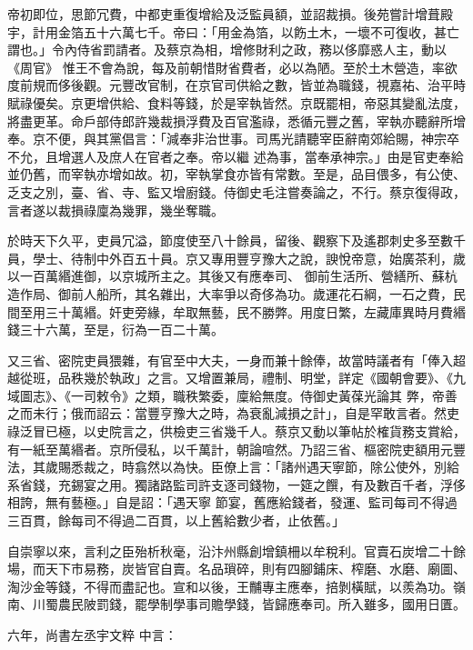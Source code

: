 \begin{pinyinscope}
 帝初即位，思節冗費，中都吏重復增給及泛監員額，並詔裁損。後苑嘗計增葺殿宇，計用金箔五十六萬七千。帝曰：「用金為箔，以飭土木，一壞不可復收，甚亡謂也。」令內侍省罰請者。及蔡京為相，增修財利之政，務以侈靡惑人主，動以《周官》
 惟王不會為說，每及前朝惜財省費者，必以為陋。至於土木營造，率欲度前規而侈後觀。元豐改官制，在京官司供給之數，皆並為職錢，視嘉祐、治平時賦祿優矣。京更增供給、食料等錢，於是宰執皆然。京既罷相，帝惡其變亂法度，將盡更革。命戶部侍郎許幾裁損浮費及百官濫祿，悉循元豐之舊，宰執亦聽辭所增奉。京不便，與其黨倡言：「減奉非治世事。司馬光請聽宰臣辭南郊給賜，神宗卒不允，且增選人及庶人在官者之奉。帝以繼
 述為事，當奉承神宗。」由是官吏奉給並仍舊，而宰執亦增如故。初，宰執掌食亦皆有常數。至是，品目偎多，有公使、乏支之別，臺、省、寺、監又增廚錢。侍御史毛注嘗奏論之，不行。蔡京復得政，言者遂以裁損祿廩為幾罪，幾坐奪職。



 於時天下久平，吏員冗溢，節度使至八十餘員，留後、觀察下及遙郡刺史多至數千員，學士、待制中外百五十員。京又專用豐亨豫大之說，諛悅帝意，始廣茶利，歲以一百萬緡進御，以京城所主之。其後又有應奉司、
 御前生活所、營繕所、蘇杭造作局、御前人船所，其名雜出，大率爭以奇侈為功。歲運花石綱，一石之費，民間至用三十萬緡。奸吏旁緣，牟取無藝，民不勝弊。用度日繁，左藏庫異時月費緡錢三十六萬，至是，衍為一百二十萬。



 又三省、密院吏員猥雜，有官至中大夫，一身而兼十餘俸，故當時議者有「俸入超越從班，品秩幾於執政」之言。又增置兼局，禮制、明堂，詳定《國朝會要》、《九域圖志》、《一司敕令》之類，職秩繁委，廩給無度。侍御史黃葆光論其
 弊，帝善之而未行；俄而詔云：當豐亨豫大之時，為衰亂減損之計」，自是罕敢言者。然吏祿泛冒已極，以史院言之，供檢吏三省幾千人。蔡京又動以筆帖於榷貨務支賞給，有一紙至萬緡者。京所侵私，以千萬計，朝論喧然。乃詔三省、樞密院吏額用元豐法，其歲賜悉裁之，時翕然以為快。臣僚上言：「諸州遇天寧節，除公使外，別給系省錢，充錫宴之用。獨諸路監司許支逐司錢物，一筵之饌，有及數百千者，浮侈相誇，無有藝極。」自是詔：「遇天寧
 節宴，舊應給錢者，發運、監司每司不得過三百貫，餘每司不得過二百貫，以上舊給數少者，止依舊。」



 自崇寧以來，言利之臣殆析秋毫，沿汴州縣創增鎮柵以牟稅利。官賣石炭增二十餘場，而天下市易務，炭皆官自賣。名品瑣碎，則有四腳鋪床、榨磨、水磨、廟圖、淘沙金等錢，不得而盡記也。宣和以後，王黼專主應奉，掊剝橫賦，以羨為功。嶺南、川蜀農民陂罰錢，罷學制學事司贍學錢，皆歸應奉司。所入雖多，國用日匱。



 六年，尚書左丞宇文粹
 中言：




\end{pinyinscope}
